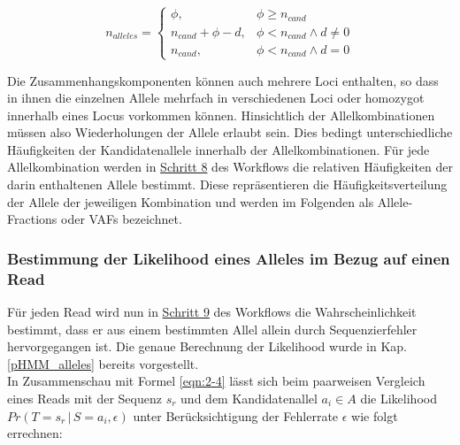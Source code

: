 \begin{equation} \label{eqn:2-8}
\tag{2-8}
n_{alleles} =
\left\{
\begin{array}{ll}
\phi, & \phi \geq n_{cand} \\
n_{cand} + \phi - d, & \phi < n_{cand} \wedge d \neq 0\\
n_{cand}, & \phi < n_{cand} \wedge d = 0
\end{array}
\right.
\end{equation}

Die Zusammenhangskomponenten können auch mehrere Loci enthalten, so dass in ihnen die einzelnen Allele mehrfach in verschiedenen Loci oder homozygot innerhalb eines Locus vorkommen können. Hinsichtlich der Allelkombinationen müssen also Wiederholungen der Allele erlaubt sein. Dies bedingt unterschiedliche Häufigkeiten der Kandidatenallele innerhalb der Allelkombinationen. Für jede Allelkombination werden in \hyperref[step8]{Schritt 8\label{step8txt}} des Workflows die relativen Häufigkeiten der darin enthaltenen Allele bestimmt. Diese repräsentieren die Häufigkeitsverteilung der Allele der jeweiligen Kombination und werden im Folgenden als Allele-Fractions oder VAFs bezeichnet.\\
%

\subsubsection{Bestimmung der Likelihood eines Alleles im Bezug auf einen Read} \label{sol_al_read}

Für jeden Read wird nun in \hyperref[step9]{Schritt 9} des Workflows die Wahrscheinlichkeit bestimmt, dass er aus einem bestimmten Allel allein durch Sequenzierfehler hervorgegangen ist. Die genaue Berechnung der Likelihood wurde in Kap. \ref{pHMM_alleles} bereits vorgestellt. \\

In Zusammenschau mit Formel \eqref{eqn:2-4} lässt sich beim paarweisen Vergleich eines Reads mit der Sequenz $s_{r}$ und dem Kandidatenallel $a_{i} \in A $ die Likelihood $ Pr(T=s_{r} \, | \, S=a_{i}, \epsilon) $ unter Berücksichtigung der Fehlerrate $\epsilon$ wie folgt errechnen:
\vspace{-0.5cm}
\begin{center}
\end{center}

